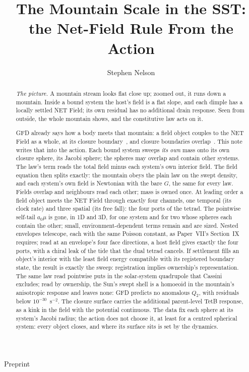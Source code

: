 \documentclass[twocolumn]{iopjournal}
\renewcommand{\articletype}[1]{%
  {\vspace*{-8mm}\noindent \Large \sf Preprint}\par
  \vspace*{6mm}\noindent{\scriptsize \sf{\bfseries \MakeUppercase{#1}}}}
\begin{document}
\articletype{Supplementary Material}

\title{The Mountain Scale in the SST: the Net-Field Rule From the Action}

\author{Stephen Nelson}



\begin{abstract}
\emph{The picture.} A mountain stream looks flat close up; zoomed out,
it runs down a mountain. Inside a bound system the host's field is a
flat slope, and each dimple has a locally settled NET Field; its own
residual has no additional drain response. Seen from outside, the
whole mountain shows, and the constitutive law acts on it.

GFD already says how a body meets that mountain: a field object couples
to the NET Field as a whole, at its closure boundary~\cite{NelsonI},
and closure boundaries overlap~\cite{NelsonII}. This note writes that
into the action. Each bound system sweeps \emph{its own} mass onto its
own closure sphere, its Jacobi sphere; the spheres may overlap and
contain other systems. The law's term reads the total field minus each
system's own interior field. The field equation then splits exactly:
the mountain obeys the plain law on the swept density, and each
system's own field is Newtonian with the bare $G$, the same for every
law. Fields overlap and neighbours read each other; mass is owned once.
At leading order a field object meets the NET Field through exactly
four channels, one temporal (its clock rate) and three spatial (its
free fall): the four ports of the tetrad. The pointwise self-tail $a_0\mu$ is gone, in 1D and 3D, for one system
and for two whose spheres each contain the other; small,
environment-dependent terms remain and are sized.
Nested envelopes telescope, each with the same Poisson constant, as
Paper~VII's Section~IX requires; read at an envelope's four face
directions, a host field gives exactly the four ports, with a chiral
leak of the tide that the dual tetrad cancels. If settlement fills an object's interior with the least field energy
compatible with its registered boundary state, the result is exactly
the sweep: registration implies ownership's representation. The same
law read pointwise puts in the solar-system quadrupole that Cassini
excludes; read by ownership, the Sun's swept shell is a homoeoid in the
mountain's anisotropic response and leaves none: GFD predicts no
anomalous $Q_2$, with residuals below $10^{-30}$~s$^{-2}$. The closure
surface carries the additional parent-level TetB response, as a kink
in the field with the potential continuous. The data
fix each sphere at its system's Jacobi radius; the action does not choose it, at least
for a centred spherical system: every object closes, and where its
surface sits is set by the dynamics.
\end{abstract}
\end{document}
